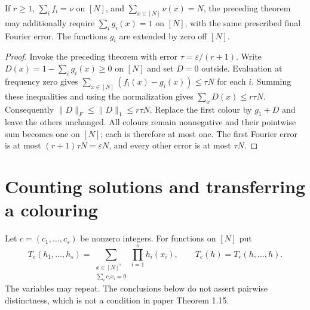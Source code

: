 \begin{lemma}
\label{app:dense-partition-model}
\leanok
If $r\geq1$, $\sum_i f_i=\nu$ on $[N]$, and
$\sum_{x\in[N]}\nu(x)=N$, the preceding theorem may additionally require
$\sum_i g_i(x)=1$ on $[N]$, with the same prescribed final Fourier error.
The functions $g_i$ are extended by zero off $[N]$.
\end{lemma}
\begin{proof}
Invoke the preceding theorem with error $\tau=\varepsilon/(r+1)$.
Write $D(x)=1-\sum_i g_i(x)\geq0$ on $[N]$ and set $D=0$ outside.
Evaluation at frequency zero gives
$\sum_{x\in[N]}(f_i(x)-g_i(x))\leq\tau N$ for each $i$.
Summing these inequalities and using the normalization gives
$\sum_xD(x)\leq r\tau N$.  Consequently
$\|D\|_F\leq\|D\|_1\leq r\tau N$.
Replace the first colour by $g_1+D$ and leave the others unchanged.
All colours remain nonnegative and their pointwise sum becomes one on $[N]$;
each is therefore at most one.  The first Fourier error is at most
$(r+1)\tau N=\varepsilon N$, and every other error is at most $\tau N$.
\end{proof}

\section{Counting solutions and transferring a colouring}

\begin{definition}
\label{app:linear-count}
\leanok
Let $c=(c_1,\ldots,c_s)$ be nonzero integers.  For functions on $[N]$ put
\[
 T_c(h_1,\ldots,h_s)=
 \sum_{\substack{x\in[N]^s\\\sum_ic_ix_i=0}}\prod_{i=1}^s h_i(x_i),
 \qquad T_c(h)=T_c(h,\ldots,h).
\]
The variables may repeat.  The conclusions below do not assert pairwise
distinctness, which is not a condition in paper Theorem 1.15.
\end{definition}

